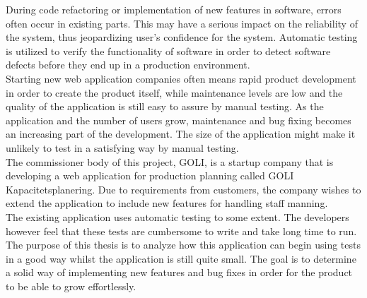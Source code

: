 During code refactoring or implementation of new features in software,
errors often occur in existing parts. This may have a serious impact on
the reliability of the system, thus jeopardizing user's confidence for
the system. Automatic testing is utilized to verify the functionality of
software in order to detect software defects before they end up in a
production environment.\\

Starting new web application companies often means rapid product
development in order to create the product itself, while maintenance
levels are low and the quality of the application is still easy to
assure by manual testing. As the application and the number of users
grow, maintenance and bug fixing becomes an increasing part of the
development. The size of the application might make it unlikely to
test in a satisfying way by manual testing.\\

The commissioner body of this project, GOLI, is a startup company that
is developing a web application for production planning called GOLI
Kapacitetsplanering. Due to requirements from customers, the company
wishes to extend the application to include new features for handling
staff manning. \\

The existing application uses automatic testing to some extent. The
developers however feel that these tests are cumbersome to write and
take long time to run. The purpose of this thesis is to analyze how
this application can begin using tests in a good way whilst the
application is still quite small. The goal is to determine a solid way
of implementing new features and bug fixes in order for the product to
be able to grow effortlessly.\\
